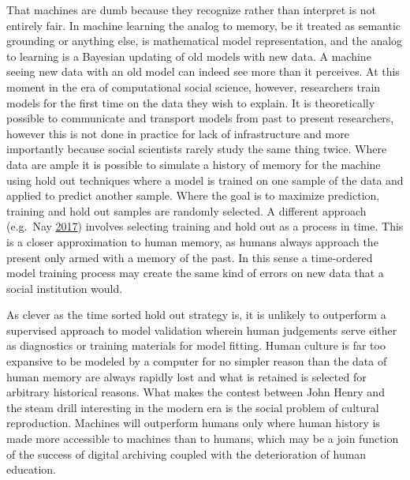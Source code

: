\documentclass[]{book}
\theoremstyle{definition}
\theoremstyle{definition}
\theoremstyle{definition}
\theoremstyle{remark}
\begin{document}
That machines are dumb because they recognize rather than interpret is
not entirely fair. In machine learning the analog to memory, be it
treated as semantic grounding or anything else, is mathematical model
representation, and the analog to learning is a Bayesian updating of old
models with new data. A machine seeing new data with an old model can
indeed see more than it perceives. At this moment in the era of
computational social science, however, researchers train models for the
first time on the data they wish to explain. It is theoretically
possible to communicate and transport models from past to present
researchers, however this is not done in practice for lack of
infrastructure and more importantly because social scientists rarely
study the same thing twice. Where data are ample it is possible to
simulate a history of memory for the machine using hold out techniques
where a model is trained on one sample of the data and applied to
predict another sample. Where the goal is to maximize prediction,
training and hold out samples are randomly selected. A different
approach (e.g.~Nay \protect\hyperlink{ref-Nay2017Predicting}{2017})
involves selecting training and hold out as a process in time. This is a
closer approximation to human memory, as humans always approach the
present only armed with a memory of the past. In this sense a
time-ordered model training process may create the same kind of errors
on new data that a social institution would.

As clever as the time sorted hold out strategy is, it is unlikely to
outperform a supervised approach to model validation wherein human
judgements serve either as diagnostics or training materials for model
fitting. Human culture is far too expansive to be modeled by a computer
for no simpler reason than the data of human memory are always rapidly
lost and what is retained is selected for arbitrary historical reasons.
What makes the contest between John Henry and the steam drill
interesting in the modern era is the social problem of cultural
reproduction. Machines will outperform humans only where human history
is made more accessible to machines than to humans, which may be a join
function of the success of digital archiving coupled with the
deterioration of human education.
\end{document}
